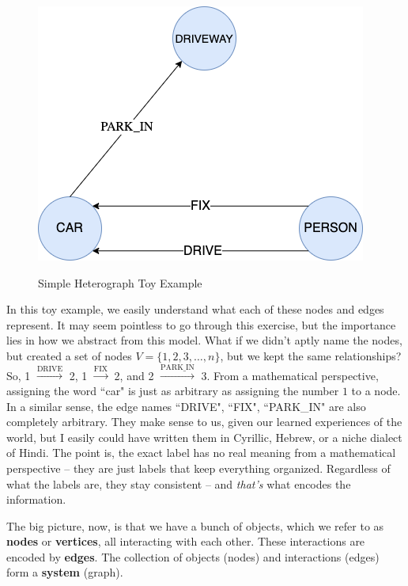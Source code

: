 \documentclass[12pt]{article}
\theoremstyle{definition}
\begin{document}
\begin{figure}[hbt!]
\vspace{-0.125in}
\par
\begin{center}
\caption{Simple Heterograph Toy Example}
\vspace{0.1in}
\label{fig:simpleHetGraph}
\includegraphics[scale=0.4]{Figures/SimpleHetGraph.png}
\end{center}
\par
\vspace{-0.25in}
\medskip
\end{figure}

In this toy example, we easily understand what each of these nodes and edges represent. It may seem pointless to go through this exercise, but the importance lies in how we abstract from this model. What if we didn't aptly name the nodes, but created a set of nodes $V = \{1, 2, 3, \dots, n\}$, but we kept the same relationships? So, 1 $\xrightarrow{\text{DRIVE}}$ 2, 1 $\xrightarrow{\text{FIX}}$ 2, and 2 $\xrightarrow{\text{PARK\_IN}}$ 3. From a mathematical perspective, assigning the word ``car" is just as arbitrary as assigning the number $1$ to a node. In a similar sense, the edge names ``DRIVE", ``FIX", ``PARK\_IN" are also completely arbitrary. They make sense to us, given our learned experiences of the world, but I easily could have written them in Cyrillic, Hebrew, or a niche dialect of Hindi. The point is, the exact label has no real meaning from a mathematical perspective -- they are just labels that keep everything organized. Regardless of what the labels are, they stay consistent -- and \textit{that's} what encodes the information.

The big picture, now, is that we have a bunch of objects, which we refer to as \textbf{nodes} or \textbf{vertices}, all interacting with each other. These interactions are encoded by \textbf{edges}. The collection of objects (nodes) and interactions (edges) form a \textbf{system} (graph). 
\end{document}
